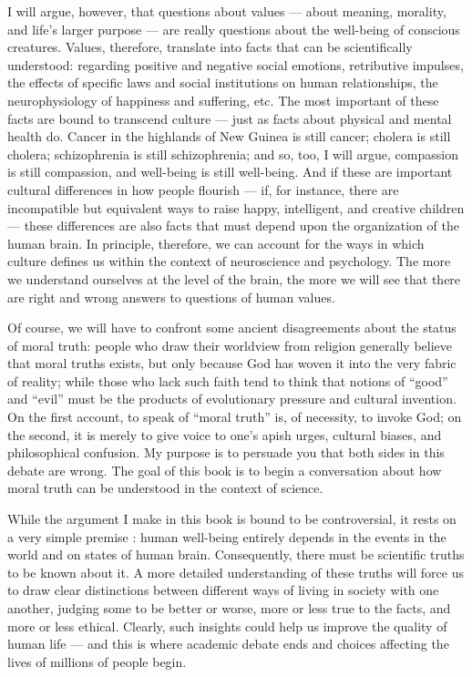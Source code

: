 \documentclass[a4paper,14pt]{extbook}
\begin{document}
I will argue, however, that questions about values --- about meaning, morality, and life's larger purpose --- are really questions about the well-being of conscious creatures.
Values, therefore, translate into facts that can be scientifically understood: regarding positive and negative social emotions, retributive impulses, the effects of specific laws and social institutions on human relationships, the neurophysiology of happiness and suffering, etc.
The most important of these facts are bound to transcend culture --- just as facts about physical and mental health do.
Cancer in the highlands of New Guinea is still cancer;
cholera is still cholera;
schizophrenia is still schizophrenia;
and so, too, I will argue, compassion is still compassion, and well-being is still well-being.
And if these are important cultural differences in how people flourish --- if, for instance, there are incompatible but equivalent ways to raise happy, intelligent, and creative children --- these differences are also facts that must depend upon the organization of the human brain.
In principle, therefore, we can account for the ways in which culture defines us within the context of neuroscience and psychology.
The more we understand ourselves at the level of the brain, the more we will see that there are right and wrong answers to questions of human values.

Of course, we will have to confront some ancient disagreements about the status of moral truth:
people who draw their worldview from religion generally believe that moral truths exists, but only because God has woven it into the very fabric of reality;
while those who lack such faith tend to think that notions of ``good'' and ``evil'' must be the products of evolutionary pressure and cultural invention.
On the first account, to speak of ``moral truth'' is, of necessity, to invoke God;
on the second, it is merely to give voice to one's apish urges, cultural biases, and philosophical confusion.
My purpose is to persuade you that both sides in this debate are wrong.
The goal of this book is to begin a conversation about how moral truth can be understood in the context of science.

While the argument I make in this book is bound to be controversial, it rests on a very simple premise :
human well-being entirely depends in the events in the world and on states of human brain.
Consequently, there must be scientific truths to be known about it.
A more detailed understanding of these truths will force us to draw clear distinctions between different ways of living in society with one another, judging some to be better or worse, more or less true to the facts, and more or less ethical.
Clearly, such insights could help us improve the quality of human life --- and this is where academic debate ends and choices affecting the lives of millions of people begin.
\end{document}

